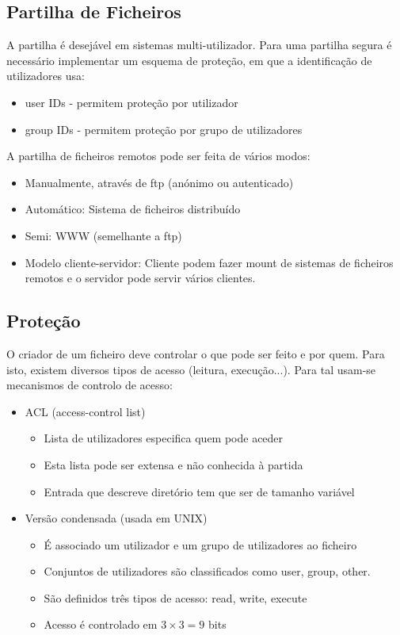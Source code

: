 \documentclass[10pt,a4paper]{report}
\begin{document}
\subsection{Partilha de Ficheiros}
A partilha é desejável em sistemas multi-utilizador. Para uma partilha segura é necessário implementar um esquema de proteção, em que a identificação de utilizadores usa:
\begin{itemize}
\item user IDs - permitem proteção por utilizador
\item group IDs - permitem proteção por grupo de utilizadores
\end{itemize}
A partilha de ficheiros remotos pode ser feita de vários modos:
\begin{itemize}
\item Manualmente, através de ftp (anónimo ou autenticado)
\item Automático: Sistema de ficheiros distribuído
\item Semi: WWW (semelhante a ftp)
\item Modelo cliente-servidor: Cliente podem fazer mount de sistemas de ficheiros remotos e o servidor pode servir vários clientes. 
\end{itemize}
\subsection{Proteção}
O criador de um ficheiro deve controlar o que pode ser feito e por quem. Para isto, existem diversos tipos de acesso (leitura, execução...). Para tal usam-se mecanismos de controlo de acesso:
\begin{itemize}
\item ACL (access-control list)
\begin{itemize}
\item Lista de utilizadores especifica quem pode aceder
\item Esta lista pode ser extensa e não conhecida à partida
\item Entrada que descreve diretório tem que ser de tamanho variável
\end{itemize}
\item Versão condensada (usada em UNIX)
\begin{itemize}
\item É associado um utilizador e um grupo de utilizadores ao ficheiro
\item Conjuntos de utilizadores são classificados como user, group, other.
\item São definidos três tipos de acesso: read, write, execute
\item Acesso é controlado em $3 \times 3 = 9$ bits
\end{itemize}
\end{itemize}
\end{document}

